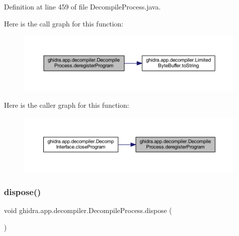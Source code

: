 Definition at line 459 of file Decompile\+Process.\+java.

Here is the call graph for this function\+:
\nopagebreak
\begin{figure}[H]
\begin{center}
\leavevmode
\includegraphics[width=350pt]{classghidra_1_1app_1_1decompiler_1_1_decompile_process_a0f33c60970b4db8f9f42d31623cd91c9_cgraph}
\end{center}
\end{figure}
Here is the caller graph for this function\+:
\nopagebreak
\begin{figure}[H]
\begin{center}
\leavevmode
\includegraphics[width=350pt]{classghidra_1_1app_1_1decompiler_1_1_decompile_process_a0f33c60970b4db8f9f42d31623cd91c9_icgraph}
\end{center}
\end{figure}
\mbox{\label{classghidra_1_1app_1_1decompiler_1_1_decompile_process_aa2643106f26e9f4e6e603431903f29e4}} 
\subsubsection{\texorpdfstring{dispose()}{dispose()}}
{\footnotesize\ttfamily void ghidra.\+app.\+decompiler.\+Decompile\+Process.\+dispose (\begin{DoxyParamCaption}{ }\end{DoxyParamCaption})\hspace{0.3cm}{\ttfamily [inline]}}



